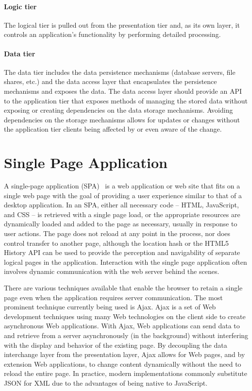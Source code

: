 \paragraph{Logic tier}
The logical tier is pulled out from the presentation tier and, as its own layer, it controls an application’s functionality by performing detailed processing.

\paragraph{Data tier}
The data tier includes the data persistence mechanisms (database servers, file shares, etc.) and the data access layer that encapsulates the persistence mechanisms and exposes the data. The data access layer should provide an API to the application tier that exposes methods of managing the stored data without exposing or creating dependencies on the data storage mechanisms. Avoiding dependencies on the storage mechanisms allows for updates or changes without the application tier clients being affected by or even aware of the change.




\section{Single Page Application}
\label{spa}
A single-page application (SPA)~\cite{mikowski2013single} is a web application or web site that fits on a single web page with the goal of providing a user experience similar to that of a desktop application. In an SPA, either all necessary code – HTML, JavaScript, and CSS – is retrieved with a single page load, or the appropriate resources are dynamically loaded and added to the page as necessary, usually in response to user actions. The page does not reload at any point in the process, nor does control transfer to another page, although the location hash or the HTML5 History API can be used to provide the perception and navigability of separate logical pages in the application. Interaction with the single page application often involves dynamic communication with the web server behind the scenes.\par
	There are various techniques available that enable the browser to retain a single page even when the application requires server communication. The most prominent technique currently being used is Ajax. Ajax is a set of Web development techniques using many Web technologies on the client side to create asynchronous Web applications. With Ajax, Web applications can send data to and retrieve from a server asynchronously (in the background) without interfering with the display and behavior of the existing page. By decoupling the data interchange layer from the presentation layer, Ajax allows for Web pages, and by extension Web applications, to change content dynamically without the need to reload the entire page. In practice, modern implementations commonly substitute JSON for XML due to the advantages of being native to JavaScript.



